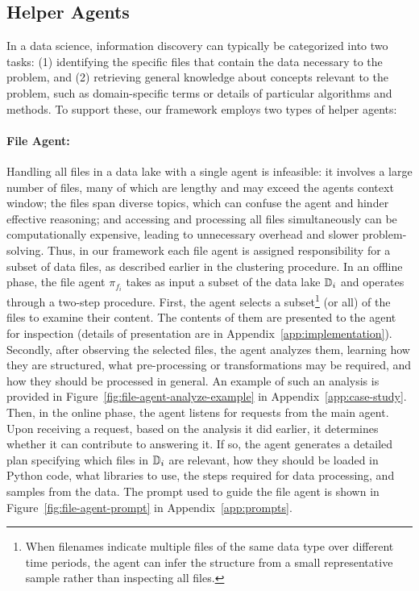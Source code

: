 \subsection{Helper Agents}
\label{sec:sub-agents}

In a data science, information discovery can typically be categorized into two tasks: (1) identifying the specific files that contain the data necessary to the problem, and (2) retrieving general knowledge about concepts relevant to the problem, such as domain-specific terms or details of particular algorithms and methods. To support these, our framework employs two types of helper agents:

\paragraph{File Agent:} 

Handling all files in a data lake with a single agent is infeasible: it involves a large number of files, many of which are lengthy and may exceed the agents context window; the files span diverse topics, which can confuse the agent and hinder effective reasoning; and accessing and processing all files simultaneously can be computationally expensive, leading to unnecessary overhead and slower problem-solving. Thus, in our framework each file agent is assigned responsibility for a subset of data files, as described earlier in the clustering procedure. In an offline phase, the file agent $\pi_{f_i}$ takes as input a subset of the data lake ${\mathbb{D}}_{i}$ and operates through a two-step procedure. First, the agent selects a subset\footnote{When filenames indicate multiple files of the same data type over different time periods, the agent can infer the structure from a small representative sample rather than inspecting all files.} (or all) of the files to examine their content. The contents of them are presented to the agent for inspection (details of presentation are in Appendix~\ref{app:implementation}). Secondly, after observing the selected files, the agent analyzes them, learning how they are structured, what pre-processing or transformations may be required, and how they should be processed in general. An example of such an analysis is provided in Figure~\ref{fig:file-agent-analyze-example} in Appendix~\ref{app:case-study}. Then, in the online phase, the agent listens for requests from the main agent. Upon receiving a request, based on the analysis it did earlier, it determines whether it can contribute to answering it. If so, the agent generates a detailed plan specifying which files in ${\mathbb{D}}_i$ are relevant, how they should be loaded in Python code, what libraries to use, the steps required for data processing, and samples from the data. The prompt used to guide the file agent is shown in Figure~\ref{fig:file-agent-prompt} in Appendix~\ref{app:prompts}. 

